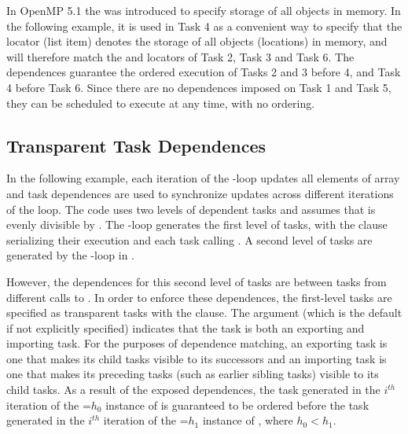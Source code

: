 In OpenMP 5.1 the   was introduced
to specify storage of all objects in memory. In the following example,
it is used in Task 4 as a convenient way to specify that the locator
(list item) denotes the storage of all objects (locations) in memory, and 
will therefore match the  and  locators of Task 2, Task 3 and Task 6.
The dependences guarantee the ordered execution of Tasks 2 and 3 before 4, and
Task 4 before Task 6.
Since there are no dependences imposed on Task 1 and Task 5, they can be
scheduled to execute at any time, with no ordering.


\subsection{Transparent Task Dependences}
\label{subsec:depend_trans_task}


In the following example, each iteration of the -loop updates all
elements of array  and task dependences are used to synchronize
updates across different iterations of the loop. The code uses two levels of
dependent tasks and assumes that
 is evenly divisible by .
The -loop generates the first level of tasks, with
the  clause serializing their execution and each task calling
. A second level of tasks are generated by the -loop in
.

However, the dependences for this second level of tasks are between tasks from
different calls to . In order to enforce these dependences, the
first-level tasks are specified as transparent tasks with the
 clause. The  argument (which
is the default if not explicitly specified) indicates that the task is both an
exporting and importing task. For the purposes of dependence matching, an
exporting task is one that makes its child tasks visible to its successors and
an importing task is one that makes its preceding tasks (such as earlier
sibling tasks) visible to its child tasks. As a result of the exposed
dependences, the task generated in the $i^{th}$ iteration of the
=$h_0$ instance of  is guaranteed to be ordered before
the task generated in the $i^{th}$ iteration of the =$h_1$ instance of
, where $h_0 < h_1$.

